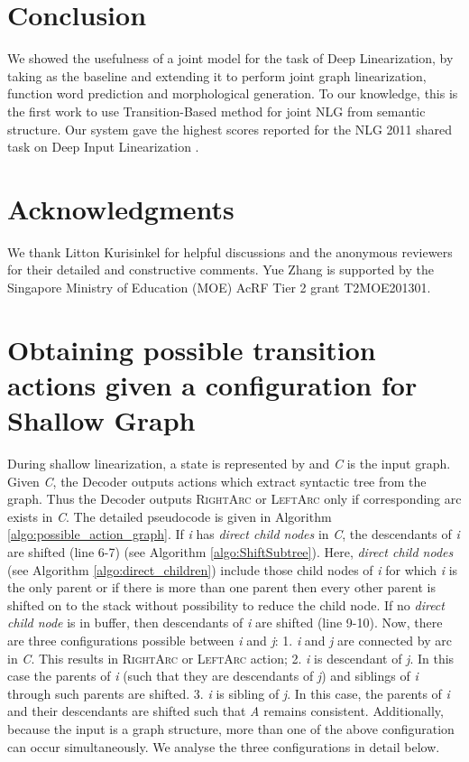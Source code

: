 \documentclass[11pt]{article}
\begin{document}
\section{Conclusion}
We showed the usefulness of a joint model for the task of Deep Linearization, by taking \cite{N16-1058} as the baseline and extending it to perform joint graph linearization, function word prediction and morphological generation. To our knowledge, this is the first work to use Transition-Based method for joint NLG from semantic structure. 
Our system gave the highest scores reported for the NLG 2011 shared task on Deep Input Linearization \cite{belz2011first}. 



\section*{Acknowledgments}
We thank Litton Kurisinkel for helpful discussions and the anonymous reviewers for their detailed and constructive comments. Yue Zhang is supported by the Singapore Ministry of Education (MOE) AcRF Tier 2 grant T2MOE201301.



\newpage
\appendix

\section{Obtaining possible transition actions given a configuration for Shallow Graph}
\label{sec:appendix-B}
During shallow linearization, a state is represented by  and {\it C} is the input graph. Given {\it C}, the Decoder outputs actions which extract syntactic tree from the graph. Thus the Decoder outputs \textsc{RightArc} or \textsc{LeftArc} only if corresponding arc exists in {\it C}. The detailed pseudocode is given in Algorithm \ref{algo:possible_action_graph}. If {\it i} has {\it direct child nodes} in {\it C}, the descendants of {\it i} are shifted (line 6-7) (see Algorithm \ref{algo:ShiftSubtree}). Here, {\it direct child nodes} (see Algorithm \ref{algo:direct_children}) include those child nodes of {\it i} for which {\it i} is the only parent or if there is more than one parent then every other parent is shifted on to the stack without possibility to reduce the child node. If no {\it direct child node} is in buffer, then descendants of {\it i} are shifted (line 9-10). Now, there are three configurations possible between {\it i} and {\it j}: 1. {\it i} and {\it j} are connected by arc in {\it C}. This results in \textsc{RightArc} or \textsc{LeftArc} action; 2. {\it i} is descendant of {\it j}. In this case the parents of {\it i} (such that they are descendants of {\it j}) and siblings of {\it i} through such parents are shifted. 3. {\it i} is sibling of {\it j}. In this case, the parents of {\it i} and their descendants are shifted such that {\it A} remains consistent. Additionally, because the input is a graph structure, more than one of the above configuration can occur simultaneously. We analyse the three configurations in detail below.
\end{document}

